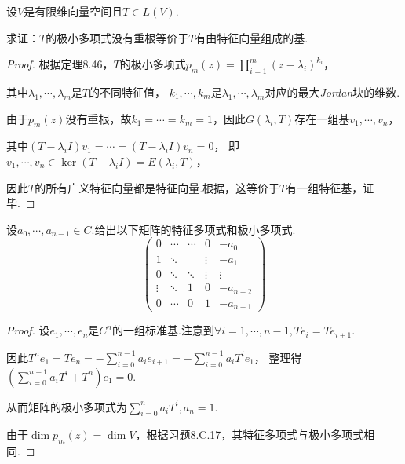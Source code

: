 \begin{problem}[12]\label{8.C.12}
    设\(V\)是有限维向量空间且\(T \in L(V)\).

    求证：\(T\)的极小多项式没有重根等价于\(T\)有由特征向量组成的基.
\end{problem}

\begin{proof}
    根据定理8.46，\(T\)的极小多项式\(p_m(z)=\prod_{i=1}^m (z-\lambda_i)^{k_i}\)，

    其中\(\lambda_1,\cdots,\lambda_m\)是\(T\)的不同特征值，
    \(k_1,\cdots,k_m\)是\(\lambda_1,\cdots,\lambda_m\)对应的最大\textit{Jordan}块的维数.
    
    由于\(p_m(z)\)没有重根，故\(k_1=\cdots=k_m=1\)，因此\(G(\lambda_i,T)\)存在一组基\(v_1,\cdots,v_n\)，
    
    其中\((T-\lambda_i I)v_1=\cdots=(T-\lambda_i I)v_n=0\)，
    即\(v_1,\cdots,v_n \in \ker (T-\lambda_i I)=E(\lambda_i,T)\)，
    
    因此\(T\)的所有广义特征向量都是特征向量.根据，这等价于\(T\)有一组特征基，证毕.
\end{proof}

\begin{problem}[18]\label{8.C.18}
    设\(a_0,\cdots,a_{n-1} \in C\).给出以下矩阵的特征多项式和极小多项式.
    \begin{equation*}
        \begin{pmatrix}
            0      & \cdots & \cdots & 0      & -a_0     \\
            1      & \ddots &        & \vdots & -a_1     \\
            0      & \ddots & \ddots & \vdots & \vdots   \\
            \vdots & \ddots & 1      & 0      & -a_{n-2} \\
            0      & \cdots & 0      & 1      & -a_{n-1} 
        \end{pmatrix}
    \end{equation*}
\end{problem}

\begin{proof}
    设\(e_1,\cdots,e_n\)是\(C^n\)的一组标准基.注意到\(\forall i=1,\cdots,n-1,Te_i=Te_{i+1}\).

    因此\(T^n e_1=Te_n=-\sum_{i=0}^{n-1}a_ie_{i+1}=-\sum_{i=0}^{n-1}a_iT^ie_1\)，
    整理得\((\sum_{i=0}^{n-1}a_iT^i+T^n)e_1=0\).
    
    从而矩阵的极小多项式为\(\sum_{i=0}^n a_iT^i,a_n=1\).
    
    由于\(\dim p_m(z)=\dim V\)，根据习题8.C.17，其特征多项式与极小多项式相同.
\end{proof}

